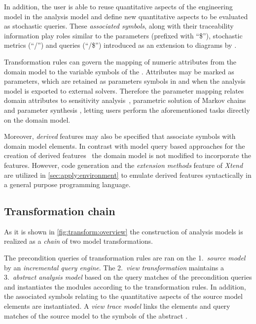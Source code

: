 In addition, the user is able to reuse quantitative aspects of the engineering model in the analysis model and define new quantitative aspects to be evaluated as stochastic queries. These \emph{associated symbols}, along with their traceability information play roles similar to the parameters (prefixed with \enquote{\$}), stochastic metrics (\enquote{/}) and queries (\enquote{/\$}) introduced as an extension to  diagrams by \citet{Bernardi03building}.

Transformation rules can govern the mapping of numeric attributes from the domain model to the variable symbols of the . Attributes may be marked as parameters, which are retained as parameters symbols in  and when the analysis model is exported to external solvers. Therefore the parameter mapping relates domain attributes to sensitivity analysis~\citep{Blake88sensitivity}, parametric solution of Markov chains~\citep{Hahn11parametric} and parameter synthesis \citep{Quatmann16mdp,Molnar17optimization}, letting users perform the aforementioned tasks directly on the domain model.

Moreover, \emph{derived} features may also be specified that associate  symbols with domain model elements. In contrast with model query based approaches for the creation of derived features~\citep{Rath12derived} the domain model is not modified to incorporate the features. However, code generation and the \emph{extension methods} feature of \emph{Xtend} are utilized in \vref{sec:apply:environment} to emulate derived features syntactically in a general purpose programming language.

\subsection{Transformation chain}

As it is shown in \vref{fig:transform:overview} the construction of  analysis models is realized as a \emph{chain} of two model transformations.

The precondition queries of transformation rules are ran on the 1.~\emph{source model} by an \emph{incremental query engine}. The 2.~\emph{view transformation} maintains a 3.~\emph{abstract analysis model} based on the query matches of the precondition queries and instantiates the  modules according to the transformation rules. In addition, the associated symbols relating to the quantitative aspects of the source model elements are instantiated. A \emph{view trace model} links the elements and query matches of the source model to the symbols of the abstract .

